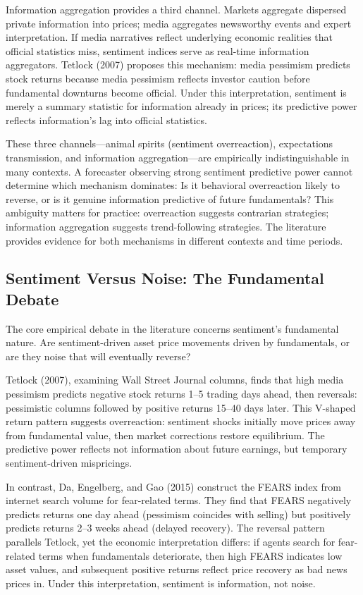 Information aggregation provides a third channel. Markets aggregate dispersed private information into prices; media aggregates newsworthy events and expert interpretation. If media narratives reflect underlying economic realities that official statistics miss, sentiment indices serve as real-time information aggregators. Tetlock (2007) proposes this mechanism: media pessimism predicts stock returns because media pessimism reflects investor caution before fundamental downturns become official. Under this interpretation, sentiment is merely a summary statistic for information already in prices; its predictive power reflects information's lag into official statistics.

These three channels---animal spirits (sentiment overreaction), expectations transmission, and information aggregation---are empirically indistinguishable in many contexts. A forecaster observing strong sentiment predictive power cannot determine which mechanism dominates: Is it behavioral overreaction likely to reverse, or is it genuine information predictive of future fundamentals? This ambiguity matters for practice: overreaction suggests contrarian strategies; information aggregation suggests trend-following strategies. The literature provides evidence for both mechanisms in different contexts and time periods.

\subsection{Sentiment Versus Noise: The Fundamental Debate}

The core empirical debate in the literature concerns sentiment's fundamental nature. Are sentiment-driven asset price movements driven by fundamentals, or are they noise that will eventually reverse?

Tetlock (2007), examining Wall Street Journal columns, finds that high media pessimism predicts negative stock returns 1--5 trading days ahead, then reversals: pessimistic columns followed by positive returns 15--40 days later. This V-shaped return pattern suggests overreaction: sentiment shocks initially move prices away from fundamental value, then market corrections restore equilibrium. The predictive power reflects not information about future earnings, but temporary sentiment-driven mispricings.

In contrast, Da, Engelberg, and Gao (2015) construct the FEARS index from internet search volume for fear-related terms. They find that FEARS negatively predicts returns one day ahead (pessimism coincides with selling) but positively predicts returns 2--3 weeks ahead (delayed recovery). The reversal pattern parallels Tetlock, yet the economic interpretation differs: if agents search for fear-related terms when fundamentals deteriorate, then high FEARS indicates low asset values, and subsequent positive returns reflect price recovery as bad news prices in. Under this interpretation, sentiment is information, not noise.

